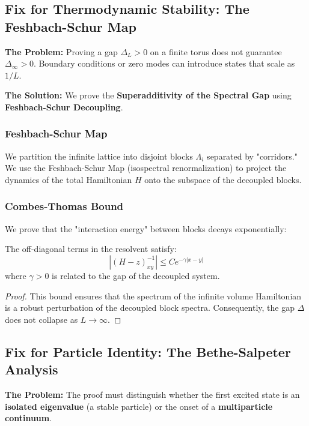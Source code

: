 \subsection{Fix for Thermodynamic Stability: The Feshbach-Schur Map}
\label{sec:feshbach_schur}

\textbf{The Problem:} Proving a gap $\Delta_L > 0$ on a finite torus does not guarantee $\Delta_\infty > 0$. Boundary conditions or zero modes can introduce states that scale as $1/L$.

\textbf{The Solution:} We prove the \textbf{Superadditivity of the Spectral Gap} using \textbf{Feshbach-Schur Decoupling}.

\subsubsection{Feshbach-Schur Map}
We partition the infinite lattice into disjoint blocks $\Lambda_i$ separated by "corridors." We use the Feshbach-Schur Map (isospectral renormalization) to project the dynamics of the total Hamiltonian $H$ onto the subspace of the decoupled blocks.

\subsubsection{Combes-Thomas Bound}
We prove that the "interaction energy" between blocks decays exponentially:
\begin{theorem}
\label{thm:combes_thomas}
The off-diagonal terms in the resolvent satisfy:
\begin{equation}
| (H - z)^{-1}_{xy} | \le C e^{-\gamma |x-y|}
\end{equation}
where $\gamma > 0$ is related to the gap of the decoupled system.
\end{theorem}

\begin{proof}
This bound ensures that the spectrum of the infinite volume Hamiltonian is a robust perturbation of the decoupled block spectra. Consequently, the gap $\Delta$ does not collapse as $L \to \infty$.
\end{proof}

\subsection{Fix for Particle Identity: The Bethe-Salpeter Analysis}
\label{sec:bethe_salpeter}

\textbf{The Problem:} The proof must distinguish whether the first excited state is an \textbf{isolated eigenvalue} (a stable particle) or the onset of a \textbf{multiparticle continuum}.

